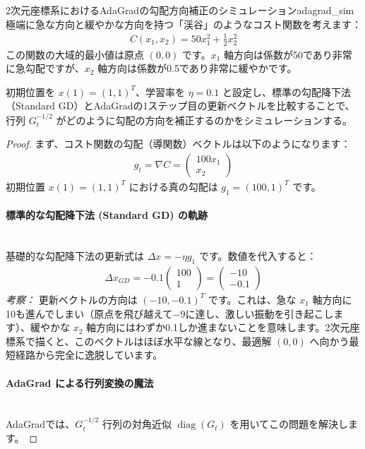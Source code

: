 \documentclass[dvipdfmx,a4paper,11pt]{jsarticle}
\begin{document}
\begin{reidai}{2次元座標系におけるAdaGradの勾配方向補正のシミュレーション}{adagrad_sim}
極端に急な方向と緩やかな方向を持つ「渓谷」のようなコスト関数を考えます：
\begin{align*}
    C(x_1, x_2) = 50x_1^2 + \frac{1}{2}x_2^2
\end{align*}
この関数の大域的最小値は原点 $(0, 0)$ です。$x_1$ 軸方向は係数が50であり非常に急勾配ですが、$x_2$ 軸方向は係数が0.5であり非常に緩やかです。

初期位置を $x(1) = (1, 1)^T$、学習率を $\eta = 0.1$ と設定し、標準の勾配降下法（Standard GD）とAdaGradの1ステップ目の更新ベクトルを比較することで、行列 $G_t^{-1/2}$ がどのように勾配の方向を補正するのかをシミュレーションする。
\end{reidai}
\begin{proof}
まず、コスト関数の勾配（導関数）ベクトルは以下のようになります：
\begin{align*}
    g_t = \nabla C = \begin{pmatrix} 100x_1 \\ x_2 \end{pmatrix}
\end{align*}
初期位置 $x(1) = (1, 1)^T$ における真の勾配は $g_1 = (100, 1)^T$ です。

\paragraph{標準的な勾配降下法 (Standard GD) の軌跡}\ \\
基礎的な勾配降下法の更新式は $\Delta x = -\eta g_1$ です。数値を代入すると：
\begin{align*}
    \Delta x_{GD} = -0.1 \begin{pmatrix} 100 \\ 1 \end{pmatrix} = \begin{pmatrix} -10 \\ -0.1 \end{pmatrix}
\end{align*}
\textit{考察：} 更新ベクトルの方向は $(-10, -0.1)^T$ です。これは、急な $x_1$ 軸方向に10も進んでしまい（原点を飛び越えて$-9$に達し、激しい振動を引き起こします）、緩やかな $x_2$ 軸方向にはわずか0.1しか進まないことを意味します。2次元座標系で描くと、このベクトルはほぼ水平な線となり、最適解 $(0,0)$ へ向かう最短経路から完全に逸脱しています。

\paragraph{AdaGrad による行列変換の魔法}\ \\
AdaGradでは、$G_t^{-1/2}$ 行列の対角近似 $\operatorname{diag}(G_t)$ を用いてこの問題を解決します。


\end{proof}
\end{document}
